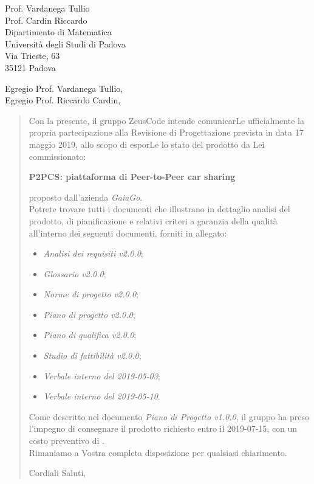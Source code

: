 \begin{letter}{
		Prof. Vardanega Tullio \\
		Prof. Cardin Riccardo \\
		Dipartimento di Matematica \\
		Università degli Studi di Padova \\
		Via Trieste, 63 \\
		35121 Padova}
		
\opening{Egregio Prof. Vardanega Tullio,\\Egregio Prof. Riccardo Cardin,}

\begin{quotation}
Con la presente, il gruppo ZeusCode intende comunicarLe ufficialmente la propria partecipazione alla Revisione di Progettazione prevista in data 17 maggio 2019, allo scopo di esporLe lo stato del prodotto
da Lei commissionato:

\begin{center}
	\textbf{P2PCS: piattaforma di Peer-to-Peer car sharing}
\end{center}

\noindent proposto dall'azienda \textit{GaiaGo}.\\
Potrete trovare tutti i documenti che illustrano in dettaglio analisi del prodotto, di pianificazione e relativi criteri a garanzia della qualità all'interno dei seguenti 
documenti, forniti in allegato:

\bigskip

\begin{itemize}
	\item \textit{Analisi dei requisiti v2.0.0};
	
	\item \textit{Glossario v2.0.0};
	
	\item \textit{Norme di progetto v2.0.0};

	\item \textit{Piano di progetto v2.0.0};

	\item \textit{Piano di qualifica v2.0.0};

	\item \textit{Studio di fattibilità v2.0.0};

	\item \textit{Verbale interno del 2019-05-03};
	\item \textit{Verbale interno del 2019-05-10}.
\end{itemize}

\bigskip

\noindent Come descritto nel documento \textit{Piano di Progetto v1.0.0}, il gruppo ha preso l'impegno di consegnare il prodotto richiesto entro il 2019-07-15, con un costo preventivo di  \textbf{}.\\
Rimaniamo a Vostra completa disposizione per qualsiasi chiarimento.

\vspace{0.5cm}
\closing{ Cordiali Saluti,}
	

\end{quotation}
		
\end{letter}


